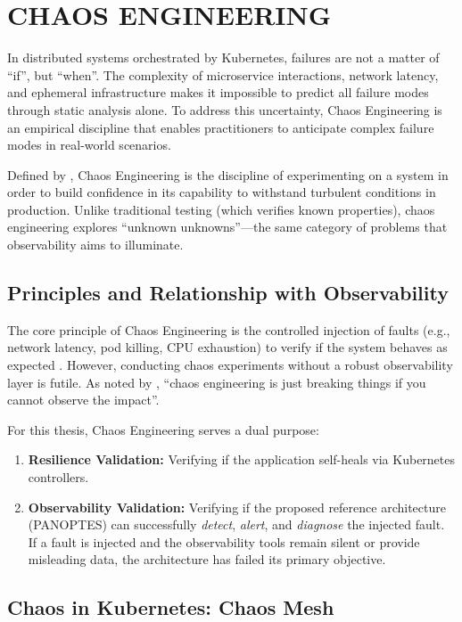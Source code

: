 \section{CHAOS ENGINEERING}
\label{sec:chaos-engineering}

In distributed systems orchestrated by Kubernetes, failures are not a matter of ``if'', but ``when''. The complexity of microservice interactions, network latency, and ephemeral infrastructure makes it impossible to predict all failure modes through static analysis alone. To address this uncertainty, Chaos Engineering is an empirical discipline that enables practitioners to anticipate complex failure modes in real-world scenarios.

Defined by , Chaos Engineering is the discipline of experimenting on a system in order to build confidence in its capability to withstand turbulent conditions in production. Unlike traditional testing (which verifies known properties), chaos engineering explores ``unknown unknowns''—the same category of problems that observability aims to illuminate.

\subsection{Principles and Relationship with Observability}

The core principle of Chaos Engineering is the controlled injection of faults (e.g., network latency, pod killing, CPU exhaustion) to verify if the system behaves as expected \cite{bloch_2019}. However, conducting chaos experiments without a robust observability layer is futile. As noted by , ``chaos engineering is just breaking things if you cannot observe the impact''.

For this thesis, Chaos Engineering serves a dual purpose:
\begin{enumerate}
    \item \textbf{Resilience Validation:} Verifying if the application self-heals via Kubernetes controllers.
    \item \textbf{Observability Validation:} Verifying if the proposed reference architecture (PANOPTES) can successfully \textit{detect}, \textit{alert}, and \textit{diagnose} the injected fault. If a fault is injected and the observability tools remain silent or provide misleading data, the architecture has failed its primary objective.
\end{enumerate}

\subsection{Chaos in Kubernetes: Chaos Mesh}

